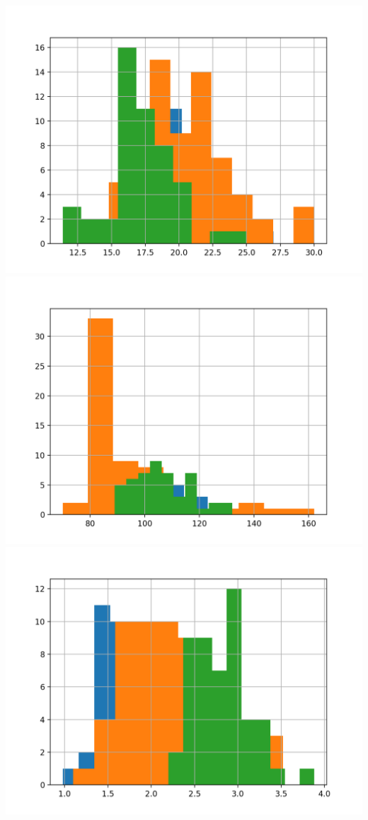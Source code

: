 \documentclass{article}
\begin{document}
\includegraphics[width=\textwidth]{v4.png}\\
\includegraphics[width=\textwidth]{v5.png}\\
\includegraphics[width=\textwidth]{v6.png}\\
\end{document}
